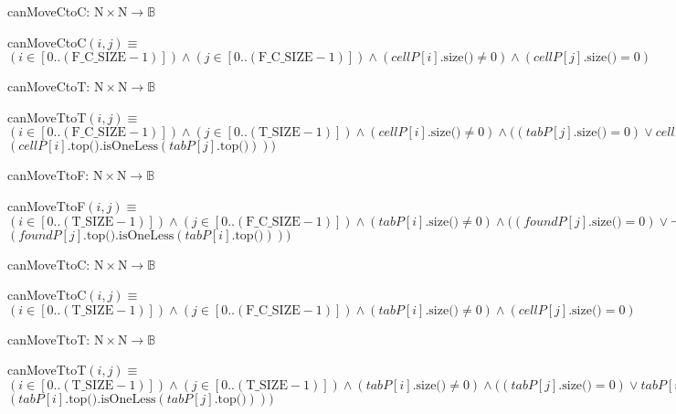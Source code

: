 \documentclass[12pt]{article}
\begin{document}
\noindent canMoveCtoC: $\mbox{N} \times \mbox{N} \rightarrow \mbox{$\mathbb{B}$}$

\noindent canMoveCtoC$(i,j) \equiv$
$(i \in [0..(\mbox{F\_C\_SIZE}-1)]) \land (j \in [0..(\mbox{F\_C\_SIZE}-1)]) \land (cellP[i].\mbox{size()} \not= 0) \land (cellP[j].\mbox{size()} = 0) $\\
\medskip

\noindent canMoveCtoT: $\mbox{N} \times \mbox{N} \rightarrow \mbox{$\mathbb{B}$}$

\noindent canMoveTtoT$(i,j) \equiv$
$(i \in [0..(\mbox{F\_C\_SIZE}-1)]) \land (j \in [0..(\mbox{T\_SIZE}-1)]) \land (cellP[i].\mbox{size()} \not= 0) \land ((tabP[j].\mbox{size()} = 0) \lor cellP[i].\mbox{top()}.\mbox{isOppositeColour}(tabP[j].\mbox{top()}) \land$\\$ (cellP[i].\mbox{top()}.\mbox{isOneLess}(tabP[j].\mbox{top()}))) $\\
\medskip

\noindent canMoveTtoF: $\mbox{N} \times \mbox{N} \rightarrow \mbox{$\mathbb{B}$}$

\noindent canMoveTtoF$(i,j) \equiv$
$(i \in [0..(\mbox{T\_SIZE}-1)]) \land (j \in [0..(\mbox{F\_C\_SIZE}-1)]) \land (tabP[i].\mbox{size()} \not= 0) \land ((foundP[j].\mbox{size()} = 0) \lor \lnot(tabP[i].\mbox{top()}.\mbox{isOppositeColour}(foundP[j].\mbox{top()})) \land$\\$ (foundP[j].\mbox{top()}.\mbox{isOneLess}(tabP[i].\mbox{top()}))) $\\
\medskip

\noindent canMoveTtoC: $\mbox{N} \times \mbox{N} \rightarrow \mbox{$\mathbb{B}$}$

\noindent canMoveTtoC$(i,j) \equiv$
$(i \in [0..(\mbox{T\_SIZE}-1)]) \land (j \in [0..(\mbox{F\_C\_SIZE}-1)]) \land (tabP[i].\mbox{size()} \not= 0) \land (cellP[j].\mbox{size()} = 0) $\\
\medskip

\noindent canMoveTtoT: $\mbox{N} \times \mbox{N} \rightarrow \mbox{$\mathbb{B}$}$

\noindent canMoveTtoT$(i,j) \equiv$
$(i \in [0..(\mbox{T\_SIZE}-1)]) \land (j \in [0..(\mbox{T\_SIZE}-1)]) \land (tabP[i].\mbox{size()} \not= 0) \land ((tabP[j].\mbox{size()} = 0) \lor tabP[i].\mbox{top()}.\mbox{isOppositeColour}(tabP[j].\mbox{top()}) \land$\\$ (tabP[i].\mbox{top()}.\mbox{isOneLess}(tabP[j].\mbox{top()}))) $\\
\medskip
\newpage
\end{document}
